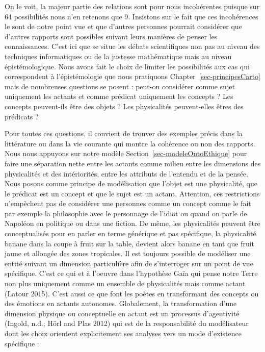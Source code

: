 \documentclass[
  letterpaper,
  DIV=11,
  numbers=noendperiod]{scrreprt}
\begin{document}
On le voit, la majeur partie des relations sont pour nous incohérentes
puisque sur 64 possibilités nous n'en retenons que 9. Insistons sur le
fait que ces incohérences le sont de notre point vue et que d'autres
personnes pourrait considérer que d'autres rapports sont possibles
suivant leurs manières de penser les connaissances. C'est ici que se
situe les débats scientifiques non pas au niveau des techniques
informatiques ou de la justesse mathématique mais au niveau
épistémologique. Nous avons fait le choix de limiter les possibilités
aux cas qui correspondent à l'épistémologie que nous pratiquons
Chapter~\ref{sec-principesCarto} mais de nombreuses questions se posent
: peut-on considérer comme sujet uniquement les actants et comme
prédicat uniquement les concepts ? Les concepts peuvent-ils être des
objets ? Les physicalités peuvent-elles êtres des prédicats ?

Pour toutes ces questions, il convient de trouver des exemples précis
dans la littérature ou dans la vie courante qui montre la cohérence ou
non des rapports. Nous nous appuyons sur notre modèle
Section~\ref{sec-modeleOntoEthique} pour faire une séparation nette
entre les actants comme milieu entre les dimensions des physicalités et
des intériorités, entre les attributs de l'entendu et de la pensée. Nous
posons comme principe de modélisation que l'objet est une physicalité,
que le prédicat est un concept et que le sujet est un actant. Attention,
ces restrictions n'empèchent pas de considérer une personnes comme un
concept comme le fait par exemple la philosophie avec le personnage de
l'idiot ou quand on parle de Napoléon en politique ou dans une fiction.
De même, les physicalités peuvent être conceptualisés pour en parler en
terme générique et pas spécifique, la physicalité banane dans la coupe à
fruit sur la table, devient alors banane en tant que fruit jaune et
allongée des zones tropicales. Il est toujours possible de modéliser une
entité suivant un dimension particulière afin de s'interroger sur un
point de vue spécifique. C'est ce qui et à l'oeuvre dans l'hypothèse
Gaïa qui pense notre Terre non plus uniquement comme un ensemble de
physicalités mais comme actant (Latour 2015). C'est aussi ce que font
les poètes en transformant des concepts ou des émotions en actants
autonomes. Globalement, la transformation d'une dimension physique ou
conceptuelle en actant est un processus d'agentivité (Ingold, n.d.; Hörl
and Plas 2012) qui est de la responsabilité du modélisateur dont les
choix orientent explicitement ses analyses vers un mode d'existence
spécifique :
\end{document}
